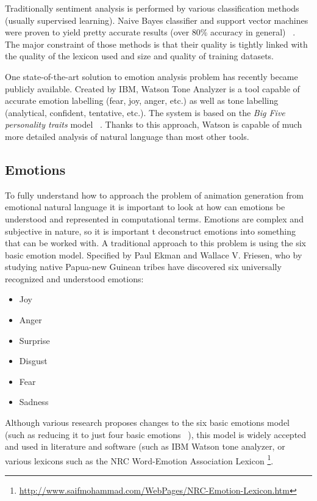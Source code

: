 Traditionally sentiment analysis is performed by various classification methods (usually supervised learning). Naive Bayes classifier and support vector machines were proven to yield pretty accurate results (over 80\% accuracy in general) ~\cite{sentimentanal1}. The major constraint of those methods is that their quality is tightly linked with the quality of the lexicon used and size and quality of training datasets.

One state-of-the-art solution to emotion analysis problem has recently became publicly available. Created by IBM, Watson Tone Analyzer is a tool capable of accurate emotion labelling (fear, joy, anger, etc.) as well as tone labelling (analytical, confident, tentative, etc.). The system is based on the \textit{Big Five personality traits} model ~\cite{watson}. Thanks to this approach, Watson is capable of much more detailed analysis of natural language than most other tools.


\subsection{Emotions}
To fully understand how to approach the problem of animation generation from emotional natural language it is important to look at how can emotions be understood and represented in computational terms. Emotions are complex and subjective in nature, so it is important t deconstruct emotions into something that can be worked with. A traditional approach to this problem is using the six basic emotion model. Specified by Paul Ekman and Wallace V. Friesen, who by studying native Papua-new Guinean tribes have discovered six universally recognized and understood emotions: ~\cite{basicemo}
\begin{itemize}
\item Joy
\item Anger
\item Surprise
\item Disgust
\item Fear
\item Sadness
\end{itemize}

Although various research proposes changes to the six basic emotions model (such as reducing it to just four basic emotions ~\cite{fouremo}), this model is widely accepted and used in literature and software (such as IBM Watson tone analyzer, or various lexicons such as the NRC Word-Emotion Association Lexicon \footnote{\url{http://www.saifmohammad.com/WebPages/NRC-Emotion-Lexicon.htm}}.

